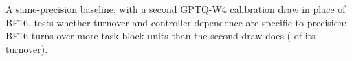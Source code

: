 \iffalse

A same-precision baseline, with a second GPTQ-W4 calibration draw in place of BF16, tests whether turnover and controller dependence are specific to precision: BF16 turns over  more task-block units than the second draw does ( of its turnover). %

